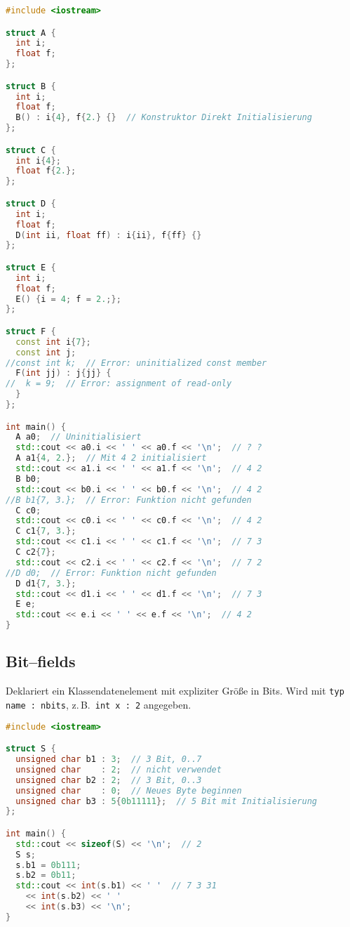 \begin{lstlisting}[language=C++]
#include <iostream>

struct A {
  int i;
  float f;
};

struct B {
  int i;
  float f;
  B() : i{4}, f{2.} {}  // Konstruktor Direkt Initialisierung
};

struct C {
  int i{4};
  float f{2.};
};

struct D {
  int i;
  float f;
  D(int ii, float ff) : i{ii}, f{ff} {}
};

struct E {
  int i;
  float f;
  E() {i = 4; f = 2.;};
};

struct F {
  const int i{7};
  const int j;
//const int k;  // Error: uninitialized const member
  F(int jj) : j{jj} {
//  k = 9;  // Error: assignment of read-only
  }
};

int main() {
  A a0;  // Uninitialisiert
  std::cout << a0.i << ' ' << a0.f << '\n';  // ? ?
  A a1{4, 2.};  // Mit 4 2 initialisiert
  std::cout << a1.i << ' ' << a1.f << '\n';  // 4 2
  B b0;
  std::cout << b0.i << ' ' << b0.f << '\n';  // 4 2
//B b1{7, 3.};  // Error: Funktion nicht gefunden
  C c0;
  std::cout << c0.i << ' ' << c0.f << '\n';  // 4 2
  C c1{7, 3.};
  std::cout << c1.i << ' ' << c1.f << '\n';  // 7 3
  C c2{7};
  std::cout << c2.i << ' ' << c2.f << '\n';  // 7 2
//D d0;  // Error: Funktion nicht gefunden
  D d1{7, 3.};
  std::cout << d1.i << ' ' << d1.f << '\n';  // 7 3
  E e;
  std::cout << e.i << ' ' << e.f << '\n';  // 4 2
}
\end{lstlisting}

\subsection{Bit--fields}

Deklariert ein Klassendatenelement mit expliziter Größe in Bits. Wird mit \lstinline|typ name : nbits|, z.\,B.\ \lstinline|int x : 2| angegeben.

\begin{lstlisting}[language=C++]
#include <iostream>

struct S {
  unsigned char b1 : 3;  // 3 Bit, 0..7
  unsigned char    : 2;  // nicht verwendet
  unsigned char b2 : 2;  // 3 Bit, 0..3
  unsigned char    : 0;  // Neues Byte beginnen
  unsigned char b3 : 5{0b11111};  // 5 Bit mit Initialisierung
};

int main() {
  std::cout << sizeof(S) << '\n';  // 2
  S s;
  s.b1 = 0b111;
  s.b2 = 0b11;
  std::cout << int(s.b1) << ' '  // 7 3 31
    << int(s.b2) << ' '
    << int(s.b3) << '\n';
}
\end{lstlisting}

